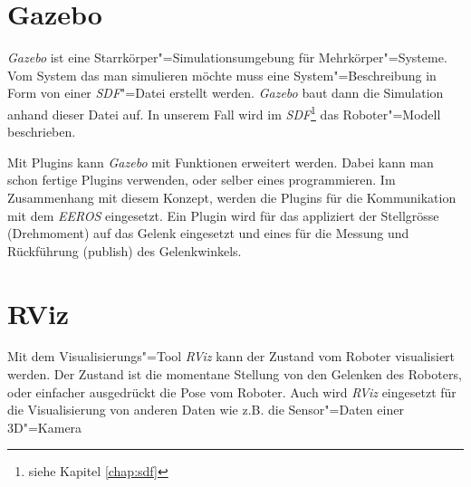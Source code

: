 %	
%	
%	
%	
%
% 	
% 
%
%
%	
%
%

\section{Gazebo}
\label{chap:gazebo}
\textit{Gazebo} ist eine Starrkörper"=Simulationsumgebung für Mehrkörper"=Systeme.
Vom System das man simulieren möchte muss eine System"=Beschreibung in Form von einer \textit{SDF}"=Datei erstellt werden.
\textit{Gazebo} baut dann die Simulation anhand dieser Datei auf. 
In unserem Fall wird im \textit{SDF}\footnote{siehe Kapitel \ref{chap:sdf}} das Roboter"=Modell beschrieben.

Mit Plugins kann \textit{Gazebo} mit Funktionen erweitert werden.
Dabei kann man schon fertige Plugins verwenden, oder selber eines programmieren.
Im Zusammenhang mit diesem Konzept, werden die Plugins für die Kommunikation mit dem \textit{EEROS} eingesetzt.
Ein Plugin wird für das appliziert der Stellgrösse (Drehmoment) auf das Gelenk eingesetzt und eines für die Messung und Rückführung (publish) des Gelenkwinkels.


\section{RViz}
\label{chap:rviz}
Mit dem Visualisierungs"=Tool \textit{RViz} kann der Zustand vom Roboter visualisiert werden.
Der Zustand ist die momentane Stellung von den Gelenken des Roboters, oder einfacher ausgedrückt die Pose vom Roboter.
Auch wird \textit{RViz} eingesetzt für die Visualisierung von anderen Daten wie z.B. die Sensor"=Daten einer 3D"=Kamera

